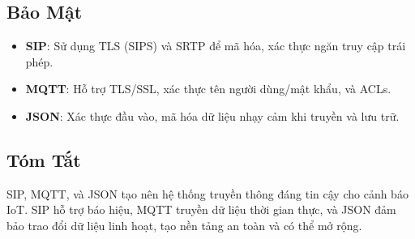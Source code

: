 \subsection{Bảo Mật}
\label{subsec:protocol_security}

\begin{itemize}
    \item \textbf{SIP}: Sử dụng TLS (SIPS) và SRTP để mã hóa, xác thực ngăn truy cập trái phép.
    \item \textbf{MQTT}: Hỗ trợ TLS/SSL, xác thực tên người dùng/mật khẩu, và ACLs.
    \item \textbf{JSON}: Xác thực đầu vào, mã hóa dữ liệu nhạy cảm khi truyền và lưu trữ.
\end{itemize}

\subsection{Tóm Tắt}
\label{subsec:protocol_summary}

SIP, MQTT, và JSON tạo nên hệ thống truyền thông đáng tin cậy cho cảnh báo IoT. SIP hỗ trợ báo hiệu, MQTT truyền dữ liệu thời gian thực, và JSON đảm bảo trao đổi dữ liệu linh hoạt, tạo nền tảng an toàn và có thể mở rộng.

